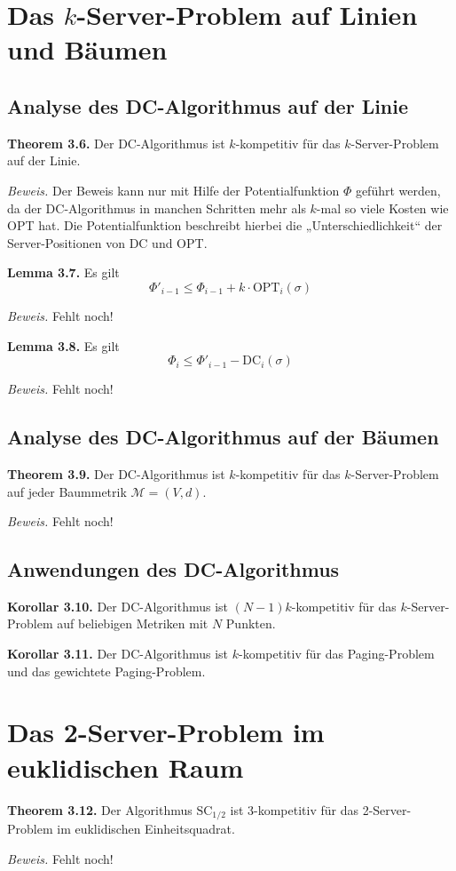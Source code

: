 \section{Das $k$-Server-Problem auf Linien und Bäumen}

\subsection{Analyse des DC-Algorithmus auf der Linie}

\textbf{Theorem 3.6.} Der DC-Algorithmus ist $k$-kompetitiv für das $k$-Server-Problem auf der Linie.

\textit{Beweis.} Der Beweis kann nur mit Hilfe der Potentialfunktion $\Phi$ geführt werden, da der DC-Algorithmus in manchen Schritten mehr als $k$-mal so viele Kosten wie OPT hat. Die Potentialfunktion beschreibt hierbei die „Unterschiedlichkeit“ der Server-Positionen von DC und OPT.

\textbf{Lemma 3.7.} Es gilt $$\Phi'_{i-1} \leq \Phi_{i-1} + k \cdot \textrm{OPT}_i(\sigma)$$

\textit{Beweis.} Fehlt noch!

\textbf{Lemma 3.8.} Es gilt $$\Phi_{i} \leq \Phi'_{i-1} - \textrm{DC}_i(\sigma)$$

\textit{Beweis.} Fehlt noch!


\subsection{Analyse des DC-Algorithmus auf der Bäumen}

\textbf{Theorem 3.9.} Der DC-Algorithmus ist $k$-kompetitiv für das $k$-Server-Problem auf jeder Baummetrik $\mathcal{M} = (V,d)$.

\textit{Beweis.} Fehlt noch!

\subsection{Anwendungen des DC-Algorithmus}

\textbf{Korollar 3.10.} Der DC-Algorithmus ist $(N-1)k$-kompetitiv für das $k$-Server-Problem auf beliebigen Metriken mit $N$ Punkten.

\textbf{Korollar 3.11.} Der DC-Algorithmus ist $k$-kompetitiv für das Paging-Problem und das gewichtete Paging-Problem.

\section{Das 2-Server-Problem im euklidischen Raum}

\textbf{Theorem 3.12.} Der Algorithmus $\textrm{SC}_{1/2}$ ist 3-kompetitiv für das 2-Server-Problem im euklidischen Einheitsquadrat.

\textit{Beweis.} Fehlt noch!
